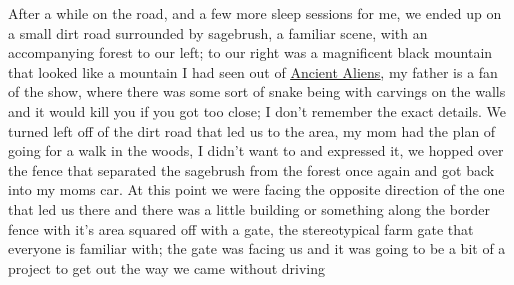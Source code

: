 \documentclass[12pt]{article}
\begin{document}
After a while on the road, and a few more sleep sessions for me, we ended up on
a small dirt road surrounded by sagebrush, a familiar scene, with an
accompanying forest to our left; to our right was a magnificent black mountain
that looked like a mountain I had seen out of
{\color{blue}\underline{\href{https://www.history.com/shows/ancient-aliens}
{Ancient Aliens}}}, my father is a fan of the show, where there was some sort of
snake being with carvings on the walls and it would kill you if you got too
close; I don't remember the exact details. We turned left off of the dirt road
that led us to the area, my mom had the plan of going for a walk in the woods, I
didn't want to and expressed it, we hopped over the fence that separated the
sagebrush from the forest once again and got back into my moms car. At this
point we were facing the opposite direction of the one that led us there and
there was a little building or something along the border fence with it's area
squared off with a gate, the stereotypical farm gate that everyone is familiar
with; the gate was facing us and it was going to be a bit of a project to get
out the way we came without driving 
\end{document}
